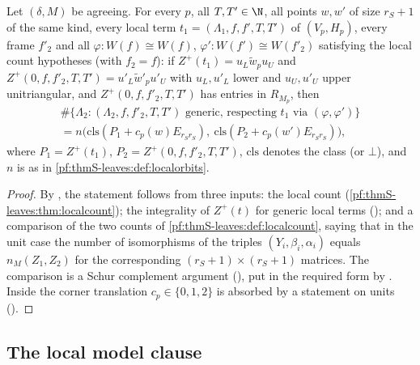 \begin{theorem}\label{pf:thmS-leaves:thm:partner}
Let $(\delta,M)$ be agreeing. For every $p$, all $T,T'\in\N$, all points $w,w'$ of size $r_S+1$ of the same kind, every local
term $t_1=(\Lambda_1,f,f',T,T')$ of $(V_p,H_p)$, every frame $f'_2$ and all $\varphi:W(f)\cong W(f)$, $\varphi':W(f')\cong W(f'_2)$ satisfying the
local count hypotheses (with $f_2=f$): if $Z^+(t_1)=u_L\tilde w_pu_U$ and $Z^+(0,f,f'_2,T,T')=u'_L\tilde w'_pu'_U$ with $u_L,u'_L$ lower and
$u_U,u'_U$ upper unitriangular, and $Z^+(0,f,f'_2,T,T')$ has entries in $R_{M_p}$, then
\begin{multline*}
\#\{\Lambda_2:(\Lambda_2,f,f'_2,T,T')\text{ generic, respecting }t_1\text{ via }(\varphi,\varphi')\}\\
=n\bigl(\mathrm{cls}(P_1+c_p(w)E_{r_Sr_S}),\ \mathrm{cls}(P_2+c_p(w')E_{r_Sr_S})\bigr),
\end{multline*}
where $P_1=Z^+(t_1)$, $P_2=Z^+(0,f,f'_2,T,T')$, $\mathrm{cls}$ denotes the class (or $\bot$), and $n$ is as in
\cref{pf:thmS-leaves:def:localorbits}.
\end{theorem}

\begin{proof}
By , the statement follows from three inputs: the local count
(\cref{pf:thmS-leaves:thm:localcount}); the integrality of $Z^+(t)$ for generic local terms
(); and a comparison of the two counts of \cref{pf:thmS-leaves:def:localcount}, saying
that in the unit case the number of isomorphisms of the triples $(Y_i,\beta_i,\alpha_i)$ equals $n_M(Z_1,Z_2)$ for the corresponding
$(r_S+1)\times(r_S+1)$ matrices. The comparison is a Schur complement argument
(), put in the required form by
. Inside  the corner
translation $c_p\in\{0,1,2\}$ is absorbed by a statement on units ().
\end{proof}

\subsection{The local model clause}\label{pf:thmS-leaves:ss:localmodel}

